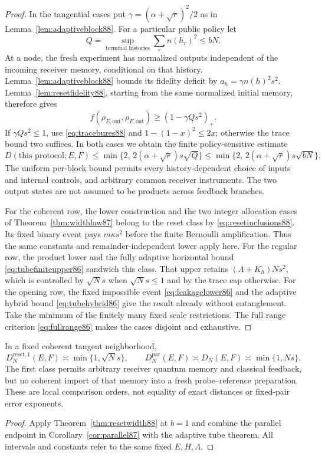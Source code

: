 \begin{proof}
In the tangential cases put $\gamma=(\alpha+\sqrt r)^2/2$ as in
Lemma~\ref{lem:adaptiveblock88}.  For a particular public policy let
\[
 Q=\sup_{\text{terminal histories}}\sum_r n(h_r)^2\le bN.
\]
At a node, the fresh experiment has normalized outputs independent
of the incoming receiver memory, conditional on that history.
Lemma~\ref{lem:adaptiveblock88} bounds its fidelity deficit by
$a_h=\gamma n(h)^2s^2$.  Lemma~\ref{lem:resetfidelity88}, starting
from the same normalized initial memory, therefore gives
\[
 f(\rho_{E,\mathrm{out}},\rho_{F,\mathrm{out}})
 \ge(1-\gamma Qs^2)_+.
\]
If $\gamma Qs^2\le1$, use \eqref{eq:tracebures88} and
$1-(1-x)^2\le2x$; otherwise the trace bound two suffices.  In both
cases we obtain the finite policy-sensitive estimate
\begin{equation}\label{eq:resetfinite88}
 D(\text{this protocol};E,F)
 \le\min\{2,\,2(\alpha+\sqrt r)s\sqrt Q\}
 \le\min\{2,\,2(\alpha+\sqrt r)s\sqrt{bN}\}.
\end{equation}
The uniform per-block bound permits every history-dependent choice
of inputs and internal controls, and arbitrary common receiver
instruments.  The two output states are not assumed to be products
across feedback branches.

For the coherent row, the lower construction and the two integer
allocation cases of Theorem~\ref{thm:widthlaw87} belong to the reset
class by \eqref{eq:resetinclusions88}.  Its fixed binary event pays
$m\kappa s^2$ before the finite Bernoulli amplification.  Thus the
same constants and remainder-independent lower apply here.
For the regular row, the product lower and the fully adaptive
horizontal bound \eqref{eq:tubefiniteupper86} sandwich this class.
That upper retains $(\Lambda+K_h)Ns^2$, which is controlled by
$\sqrt N s$ when $\sqrt N s\le1$ and by the trace cap otherwise.
For the opening row, the fixed impossible event
\eqref{eq:leakagelower86} and the adaptive hybrid bound
\eqref{eq:tubehybrid86} give the result already without entanglement.
Take the minimum of the finitely many fixed scale restrictions.
The full range criterion \eqref{eq:fullrange86} makes the cases
disjoint and exhaustive.
\end{proof}

\begin{corollary}
\label{cor:classicalfeedback88}
In a fixed coherent tangent neighborhood,
\[
 D_N^{\mathrm{reset},1}(E,F)\asymp\min\{1,\sqrt N s\},\qquad
 D_N^{\mathrm{par}}(E,F)\asymp D_N(E,F)\asymp\min\{1,Ns\}.
\]
The first class permits arbitrary receiver quantum memory and
classical feedback, but no coherent import of that memory into a
fresh probe--reference preparation.  These are local comparison
orders, not equality of exact distances or fixed-pair error exponents.
\end{corollary}
\begin{proof}
Apply Theorem~\ref{thm:resetwidth88} at $b=1$ and combine the
parallel endpoint in Corollary~\ref{cor:parallel87} with the adaptive
tube theorem.  All intervals and constants refer to the same fixed
$E,H,\Lambda$.
\end{proof}


